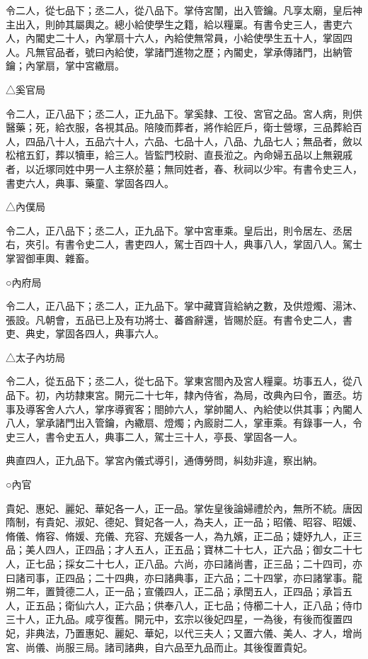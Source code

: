 \begin{pinyinscope}
 令二人，從七品下；丞二人，從八品下。掌侍宮闈，出入管鑰。凡享太廟，皇后神主出入，則帥其屬輿之。總小給使學生之籍，給以糧稟。有書令史三人，書吏六人，內閽史二十人，內掌扇十六人，內給使無常員，小給使學生五十人，掌固四人。凡無官品者，號曰內給使，掌諸門進物之歷；內閽史，掌承傳諸門，出納管鑰；內掌扇，掌中宮繖扇。



 △奚官局



 令二人，正八品下；丞二人，正九品下。掌奚隸、工役、宮官之品。宮人病，則供醫藥；死，給衣服，各視其品。陪陵而葬者，將作給匠戶，衛士營塚，三品葬給百人，四品八十人，五品六十人，六品、七品十人，八品、九品七人；無品者，斂以松棺五釘，葬以犢車，給三人。皆監門校尉、直長涖之。內命婦五品以上無親戚者，以近塚同姓中男一人主祭於墓；無同姓者，春、秋祠以少牢。有書令史三人，書吏六人，典事、藥童、掌固各四人。



 △內僕局



 令二人，正八品下；丞二人，正九品下。掌中宮車乘。皇后出，則令居左、丞居右，夾引。有書令史二人，書吏四人，駕士百四十人，典事八人，掌固八人。駕士掌習御車輿、雜畜。



 ○內府局



 令二人，正八品下；丞二人，正九品下。掌中藏寶貨給納之數，及供燈燭、湯沐、張設。凡朝會，五品已上及有功將士、蕃酋辭還，皆賜於庭。有書令史二人，書吏、典史，掌固各四人，典事六人。



 △太子內坊局



 令二人，從五品下；丞二人，從七品下。掌東宮閤內及宮人糧稟。坊事五人，從八品下。初，內坊隸東宮。開元二十七年，隸內侍省，為局，改典內曰令，置丞。坊事及導客舍人六人，掌序導賓客；閤帥六人，掌帥閽人、內給使以供其事；內閽人八人，掌承諸門出入管鑰，內繖扇、燈燭；內廄尉二人，掌車乘。有錄事一人，令史三人，書令史五人，典事二人，駕士三十人，亭長、掌固各一人。



 典直四人，正九品下。掌宮內儀式導引，通傳勞問，糾劾非違，察出納。



 ○內官



 貴妃、惠妃、麗妃、華妃各一人，正一品。掌佐皇後論婦禮於內，無所不統。唐因隋制，有貴妃、淑妃、德妃、賢妃各一人，為夫人，正一品；昭儀、昭容、昭媛、脩儀、脩容、脩媛、充儀、充容、充媛各一人，為九嬪，正二品；婕妤九人，正三品；美人四人，正四品；才人五人，正五品；寶林二十七人，正六品；御女二十七人，正七品；採女二十七人，正八品。六尚，亦曰諸尚書，正三品；二十四司，亦曰諸司事，正四品；二十四典，亦曰諸典事，正六品；二十四掌，亦曰諸掌事。龍朔二年，置贊德二人，正一品；宣儀四人，正二品；承閏五人，正四品；承旨五人，正五品；衛仙六人，正六品；供奉八人，正七品；侍櫛二十人，正八品；侍巾三十人，正九品。咸亨復舊。開元中，玄宗以後妃四星，一為後，有後而復置四妃，非典法，乃置惠妃、麗妃、華妃，以代三夫人；又置六儀、美人、才人，增尚宮、尚儀、尚服三局。諸司諸典，自六品至九品而止。其後復置貴妃。




\end{pinyinscope}
